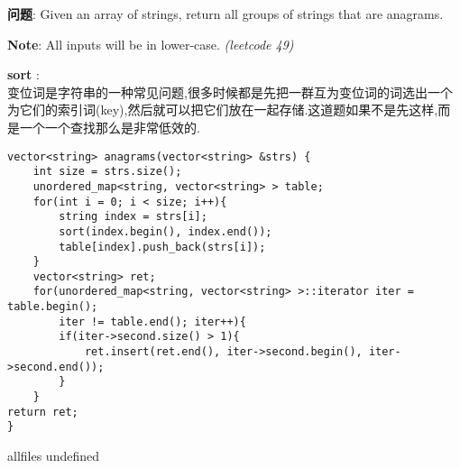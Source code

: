 \documentclass{article}
\begin{document}
\begin{CJK}{UTF8}{gbsn}     %

\else
    
\begin{description}
    \item{\textbf{问题}}: Given an array of strings, return all groups of strings that are anagrams.
	\item{\textbf{Note}}: All inputs will be in lower-case. 
	\textit{(leetcode 49)}
    \item{\textbf{sort}} : 
    \\变位词是字符串的一种常见问题,很多时候都是先把一群互为变位词的词选出一个为它们的索引词(key),然后就可以把它们放在一起存储.这道题如果不是先这样,而是一个一个查找那么是非常低效的.
    \begin{lstlisting}
vector<string> anagrams(vector<string> &strs) {
	int size = strs.size();
	unordered_map<string, vector<string> > table;
	for(int i = 0; i < size; i++){
		string index = strs[i];
		sort(index.begin(), index.end());
		table[index].push_back(strs[i]);
	}
	vector<string> ret;
	for(unordered_map<string, vector<string> >::iterator iter = table.begin();
		iter != table.end(); iter++){
		if(iter->second.size() > 1){
			ret.insert(ret.end(), iter->second.begin(), iter->second.end());
		}
	}
return ret;
}
    \end{lstlisting}
\end{description}

\fi

\ifx allfiles undefined
\end{CJK}
\end{document}
